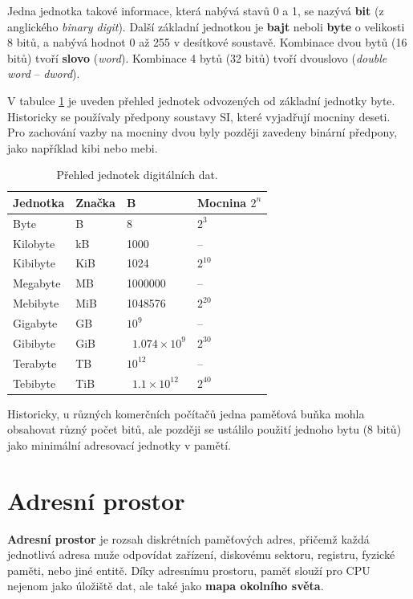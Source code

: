 Jedna jednotka takové informace, která nabývá stavů 0 a 1, se nazývá \textbf{bit} (z anglického
\textit{binary digit}). Další základní jednotkou je \textbf{bajt} neboli \textbf{byte} o velikosti 8
bitů, a nabývá hodnot 0 až 255 v desítkové soustavě. Kombinace dvou bytů (16 bitů) tvoří \textbf{slovo}
(\textit{word}). Kombinace 4 bytů (32 bitů) tvoří dvouslovo (\textit{double word} --
\textit{dword}).

V tabulce \ref{tab:data_units} je uveden přehled jednotek odvozených od základní jednotky byte.
Historicky se používaly předpony soustavy SI, které vyjadřují mocniny deseti. Pro zachování vazby na
mocniny dvou byly později zavedeny binární předpony, jako například kibi nebo mebi.

\begin{table}
    \centering
    \begin{tabular}{llp{5cm}l}
        \toprule
        \textbf{Jednotka} & \textbf{Značka} & \textbf{B} & Mocnina $2^n$ \\
        \midrule
        Byte & B & 8 & $2^3$ \\
        Kilobyte & kB & \num{1000} & -- \\
        Kibibyte & KiB & \num{1024} & $2^{10}$ \\
        Megabyte & MB & \num{1000000} & -- \\
        Mebibyte & MiB & \num{1048576} & $2^{20}$ \\
        Gigabyte & GB & $10^9$ & -- \\
        Gibibyte & GiB & ~$\num{1.074}\times10^9$ & $2^{30}$\\
        Terabyte & TB & $10^{12}$ & -- \\
        Tebibyte & TiB & ~$\num{1.1}\times10^{12}$ & $2^{40}$ \\
        \bottomrule
    \end{tabular}
    \caption{Přehled jednotek digitálních dat.}
    \label{tab:data_units}
\end{table}

Historicky, u různých komerčních počítačů jedna paměťová buňka mohla obsahovat různý počet bitů, ale
později se ustálilo použití jednoho bytu (8 bitů) jako minimální adresovací jednotky v pamětí.

\section{Adresní prostor}

\textbf{Adresní prostor} je rozsah diskrétních paměťových adres, přičemž každá jednotlivá adresa
muže odpovídat zařízení, diskovému sektoru, registru, fyzické paměti, nebo jiné entitě. Díky
adresnímu prostoru, paměť slouží pro CPU nejenom jako úložiště dat, ale také jako \textbf{mapa
okolního světa}.

